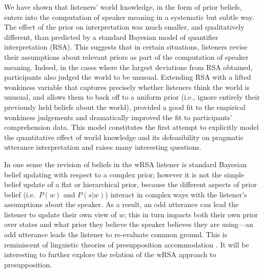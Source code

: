 \documentclass[10pt,letterpaper]{article}
\newcommand{\red}[1]{\textcolor{Red}{#1}}
\begin{document}
We have shown that listeners' world knowledge, in the form of prior beliefs, enters into the computation of speaker meaning in a systematic but subtle way. The effect of the prior on interpretation was much smaller, and qualitatively different, than predicted by a standard Bayesian model of quantifier interpretation (RSA). 
This suggests that in certain situations, listeners revise their assumptions about relevant priors as part of the computation of speaker meaning. 
Indeed, in the cases where the largest deviations from RSA obtained, participants also judged the world to be unusual.
Extending RSA with a lifted wonkiness variable that captures precisely whether listeners think the world is unusual, and allows them to back off to a uniform prior (i.e., ignore entirely their previously held beliefs about the world), provided a good fit to the empirical wonkiness judgements and dramatically improved the fit to participants' comprehension data. This model constitutes the first attempt to explicitly model the quantitative effect of world knowledge and its defeasibility on pragmatic utterance interpretation and raises many interesting questions.

In one sense the revision of beliefs in the wRSA listener is standard Bayesian belief updating with respect to a complex prior; however it is not the simple belief update of a flat or hierarchical prior, because the different aspects of prior belief (i.e.~$P(w)$ and $P(s|w)$) interact in complex ways with the listener's assumptions about the speaker.
As a result, an odd utterance can lead the listener to update their own view of $w$; this in turn impacts both their own prior over states and what prior they believe the speaker believes they are using---an odd utterance leads the listener to re-evaluate common ground. 
This is reminiscent of linguistic theories of presupposition accommodation \cite{lewis1979,stalnaker1973,stalnaker1998}.
It will be interesting to further explore the relation of the wRSA approach to presupposition.
\end{document}
